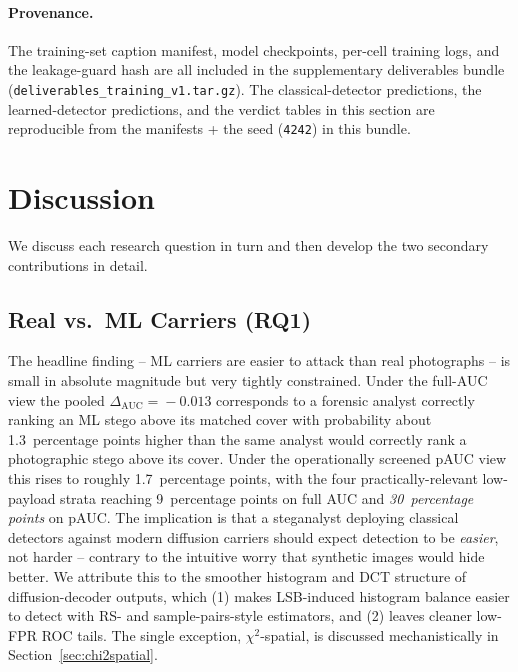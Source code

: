 \documentclass[10pt,twocolumn,a4paper]{article}
\begin{document}
\paragraph{Provenance.} The training-set caption manifest, model checkpoints, per-cell training logs, and the leakage-guard hash are all included in the supplementary deliverables bundle (\texttt{deliverables\_training\_v1.tar.gz}). The classical-detector predictions, the learned-detector predictions, and the verdict tables in this section are reproducible from the manifests + the seed (\texttt{4242}) in this bundle.

\section{Discussion}
\label{sec:discussion}

We discuss each research question in turn and then develop the two secondary contributions in detail.

\subsection{Real vs.\ ML Carriers (RQ1)}

The headline finding -- ML carriers are easier to attack than real photographs -- is small in absolute magnitude but very tightly constrained. Under the full-AUC view the pooled $\Delta_\text{AUC}\!=\!-0.013$ corresponds to a forensic analyst correctly ranking an ML stego above its matched cover with probability about 1.3~percentage points higher than the same analyst would correctly rank a photographic stego above its cover. Under the operationally screened pAUC view this rises to roughly 1.7~percentage points, with the four practically-relevant low-payload strata reaching 9~percentage points on full AUC and \emph{30~percentage points} on pAUC. The implication is that a steganalyst deploying classical detectors against modern diffusion carriers should expect detection to be \emph{easier}, not harder -- contrary to the intuitive worry that synthetic images would hide better. We attribute this to the smoother histogram and DCT structure of diffusion-decoder outputs, which (1) makes LSB-induced histogram balance easier to detect with RS- and sample-pairs-style estimators, and (2) leaves cleaner low-FPR ROC tails. The single exception, $\chi^2$-spatial, is discussed mechanistically in Section~\ref{sec:chi2spatial}.
\end{document}
